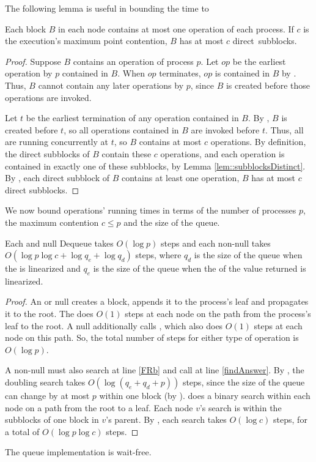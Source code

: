 The following lemma is useful in bounding the time to 
\begin{lemma}\label{blockSize}
Each block $B$ in each node contains at most one operation of each process.
If $c$ is the execution's maximum point contention, $B$ has at most $c$ direct~subblocks.
\end{lemma}
\begin{proof}
Suppose $B$ contains an operation of process $p$.
Let $op$ be the earliest operation by $p$ contained in $B$.
When $op$ terminates, $op$ is contained in $B$ by .
Thus, $B$ cannot contain any later operations by $p$, since $B$ is created before
those operations are invoked.

Let $t$ be the earliest termination of any operation contained in $B$.
By , $B$ is created before $t$, so all operations contained in $B$
are invoked before $t$.  Thus, all are  running concurrently at $t$, so $B$ contains at most $c$ operations.
By definition, the direct subblocks of $B$ contain these $c$ operations, and each operation is contained
in exactly one of these subblocks, by Lemma \ref{lem::subblocksDistinct}.
By , each direct subblock of $B$ contains at least one operation,
$B$ has at most $c$ direct subblocks.
\end{proof}

We now bound operations' running times in terms of the number of processes $p$, the maximum contention $c\leq p$ and the size of the queue. 

\begin{lemma}\label{enqDeqTime}
Each  and null Dequeue takes $O(\log p)$ steps 
and each non-null  takes
$O(\log p\log c + \log q_e+ \log q_d)$ steps,
where $q_d$ is the size of the queue when the  is linearized and 
$q_e$ is the size of the queue when the  of the value returned is linearized.
\end{lemma}
\begin{proof}
An  or null  creates a block, appends it to the process's 
leaf and propagates it to the root.  The   does $O(1)$ steps 
at each node on the path from the process's leaf to the root.
A null  additionally calls , which also does $O(1)$ steps
at each node on this path. 
So, the total number of steps for either type of operation is $O(\log p)$.

A non-null  must also search at line \ref{FRb} and call 
at line \ref{findAnswer}.
By , the doubling search takes $O(\log(q_e+q_d+p))$ steps,
since the size of the queue can change by at most $p$ within one block (by ).
 does a binary search within each node on a path from the root to a leaf.
Each node $v$'s search is within the subblocks of one block in $v$'s parent.
By , each search takes $O(\log c)$ steps, for a total of $O(\log p\log c)$ steps.
\end{proof}

\begin{corollary}
The queue implementation is wait-free.
\end{corollary}

